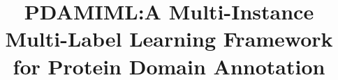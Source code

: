 \documentclass{bmcart}
\begin{document}
\begin{frontmatter}

\begin{fmbox}


\title{PDAMIML:A Multi-Instance Multi-Label Learning Framework for Protein Domain Annotation}


\author[
   addressref={aff1},                   %
   corref={aff1},                       %
   noteref={n1},                        %
   email={jane.e.doe@cambridge.co.uk}   %
]{ }
\author[
   addressref={aff1,aff2},
   email={john.RS.Smith@cambridge.co.uk}
]{ }


\address[id=aff1]{%
  , %
  ,                     %
  ,                              %
}
\address[id=aff2]{%
  ,
  ,
  ,
}


\end{fmbox}
\end{frontmatter}
\end{document}
